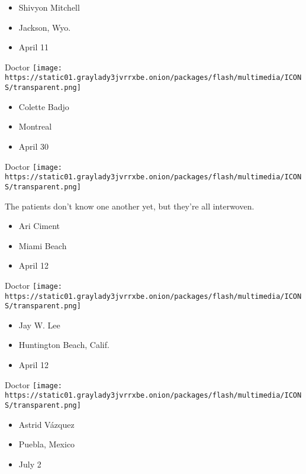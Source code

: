 \begin{itemize}
\tightlist
\item
  Shivyon Mitchell
\item
  Jackson, Wyo.
\item
  April 11
\end{itemize}

\protect\hyperlink{item-colette-badjo}{}

Doctor
\texttt{[image: https://static01.graylady3jvrrxbe.onion/packages/flash/multimedia/ICONS/transparent.png]}

\begin{itemize}
\tightlist
\item
  Colette Badjo
\item
  Montreal
\item
  April 30
\end{itemize}

\protect\hyperlink{item-ari-ciment}{}

Doctor
\texttt{[image: https://static01.graylady3jvrrxbe.onion/packages/flash/multimedia/ICONS/transparent.png]}

The patients don't know one another yet, but they're all interwoven.

\begin{itemize}
\tightlist
\item
  Ari Ciment
\item
  Miami Beach
\item
  April 12
\end{itemize}

\protect\hyperlink{item-jay-w-lee}{}

Doctor
\texttt{[image: https://static01.graylady3jvrrxbe.onion/packages/flash/multimedia/ICONS/transparent.png]}

\begin{itemize}
\tightlist
\item
  Jay W. Lee
\item
  Huntington Beach, Calif.
\item
  April 12
\end{itemize}

\protect\hyperlink{item-astrid-vazquez}{}

Doctor
\texttt{[image: https://static01.graylady3jvrrxbe.onion/packages/flash/multimedia/ICONS/transparent.png]}

\begin{itemize}
\tightlist
\item
  Astrid Vázquez
\item
  Puebla, Mexico
\item
  July 2
\end{itemize}

